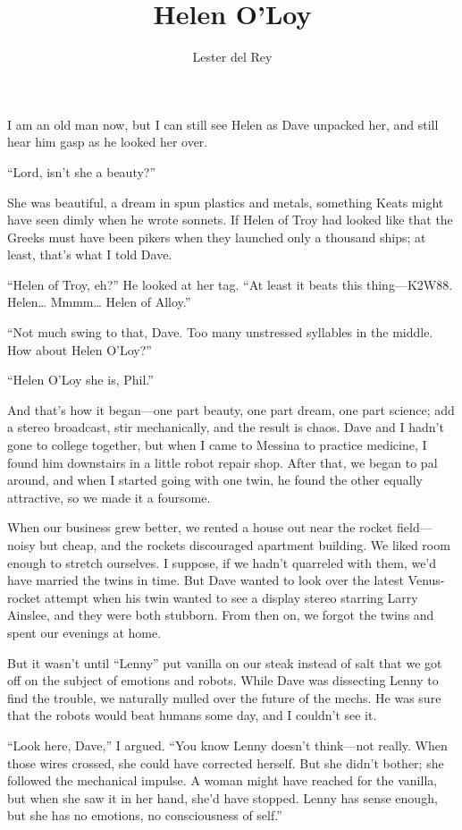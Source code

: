 \documentclass{article}
\title{Helen O'Loy}
\author{Lester del Rey}
\date{Originally published in \par \textit{Astounding Science Fiction}, December 1938.}
\begin{document}
\maketitle

I am an old man now, but I can still see Helen as Dave unpacked her, and still hear him gasp as he looked her over.

“Lord, isn’t she a beauty?”

She was beautiful, a dream in spun plastics and metals, something Keats might have seen dimly when he wrote sonnets. If Helen of Troy had looked like that the Greeks must have been pikers when they launched only a thousand ships; at least, that’s what I told Dave.

“Helen of Troy, eh?” He looked at her tag. “At least it beats this thing—K2W88. Helen… Mmmm… Helen of Alloy.”

“Not much swing to that, Dave. Too many unstressed syllables in the middle. How about Helen O’Loy?”

“Helen O’Loy she is, Phil.”

And that’s how it began—one part beauty, one part dream, one part science; add a stereo broadcast, stir mechanically, and the result is chaos. Dave and I hadn’t gone to college together, but when I came to Messina to practice medicine, I found him downstairs in a little robot repair shop. After that, we began to pal around, and when I started going with one twin, he found the other equally attractive, so we made it a foursome.

When our business grew better, we rented a house out near the rocket field—noisy but cheap, and the rockets discouraged apartment building. We liked room enough to stretch ourselves. I suppose, if we hadn’t quarreled with them, we’d have married the twins in time. But Dave wanted to look over the latest Venus-rocket attempt when his twin wanted to see a display stereo starring Larry Ainslee, and they were both stubborn. From then on, we forgot the twins and spent our evenings at home.

But it wasn’t until “Lenny” put vanilla on our steak instead of salt that we got off on the subject of emotions and robots. While Dave was dissecting Lenny to find the trouble, we naturally mulled over the future of the mechs. He was sure that the robots would beat humans some day, and I couldn’t see it.

“Look here, Dave,” I argued. “You know Lenny doesn’t think—not really. When those wires crossed, she could have corrected herself. But she didn’t bother; she followed the mechanical impulse. A woman might have reached for the vanilla, but when she saw it in her hand, she’d have stopped. Lenny has sense enough, but she has no emotions, no consciousness of self.”
\end{document}
